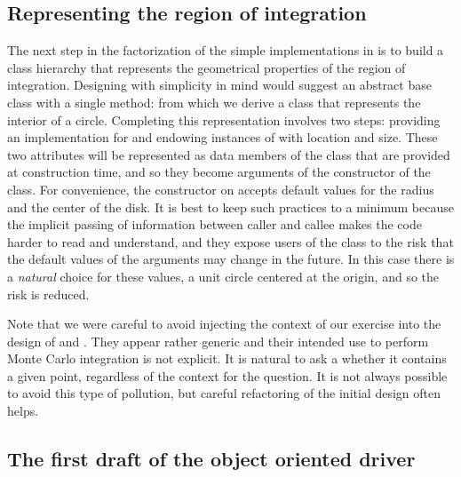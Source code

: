 \subsection{Representing the region of integration}
\label{sec:classes:region}

The next step in the factorization of the simple implementations in  is to build
a class hierarchy that represents the geometrical properties of the region of integration.
Designing with simplicity in mind would suggest an abstract base class  with a
single method:
%
%
from which we derive a class  that represents the interior of a circle.
Completing this representation involves two steps: providing an implementation for
 and endowing instances of  with location and size. These two
attributes will be represented as data members of the class that are provided at construction
time, and so they become arguments of the constructor of the class.
%
%
For convenience, the constructor on  accepts default values for
the radius and the center of the disk. It is best to keep such practices to a minimum because
the implicit passing of information between caller and callee makes the code harder to read and
understand, and they expose users of the class  to the risk that the default values
of the arguments may change in the future. In this case there is a {\em natural} choice for
these values, a unit circle centered at the origin, and so the risk is reduced.

Note that we were careful to avoid injecting the context of our exercise into the design of
 and . They appear rather generic and their intended use to perform
Monte Carlo integration is not explicit. It is natural to ask a  whether it
contains a given point, regardless of the context for the question. It is not always possible
to avoid this type of pollution, but careful refactoring of the initial design often helps. 

\subsection{The first draft of the object oriented driver}
\label{sec:classes:driver:draft}

